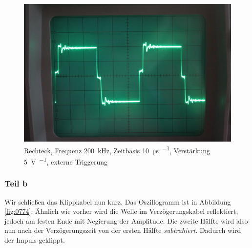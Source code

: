 \begin{figure}
	\centering
	\begin{minipage}{.45\linewidth}
	\end{minipage}
	\hfill
	\begin{minipage}{.45\linewidth}
	\includegraphics[width=\linewidth]{Fotos/IMG_0773-1500.jpg}
	\end{minipage}
	\caption{%
		Rechteck, Frequenz \SI{200}{\kilo\hertz},
		Zeitbasis \SI{10}{\micro\second\per\division},
		Verstärkung \SI{5}{\volt\per\division},
		externe Triggerung
	}
	\label{fig:0773}
\end{figure}

\FloatBarrier
\subsubsection{Teil b}

Wir schließen das Klippkabel nun kurz. Das Oszillogramm ist in Abbildung
\ref{fig:0774}. Ähnlich wie vorher wird die Welle im Verzögerungskabel
reflektiert, jedoch am festen Ende mit Negierung der Amplitude. Die zweite
Hälfte wird also nun nach der Verzögerungszeit von der ersten Hälfte
\emph{subtrahiert}. Dadurch wird der Impuls geklippt.

